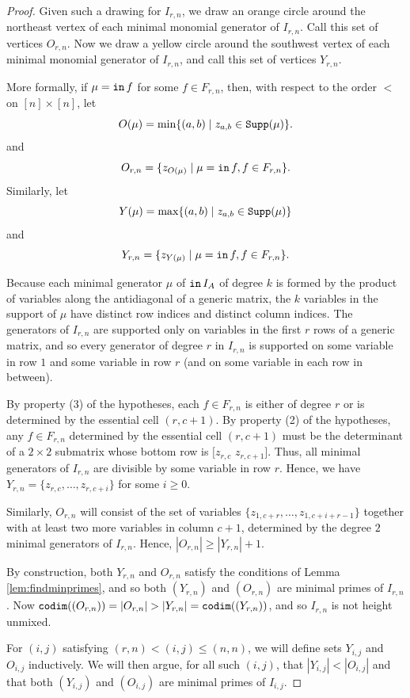 \documentclass[12 pt]{amsart}
\DeclareMathOperator{\init}{{\tt in}}
\DeclareMathOperator{\supp}{{\tt Supp}}
\DeclareMathOperator{\codim}{{\tt codim}}
\theoremstyle{plain}
\theoremstyle{definition}
\theoremstyle{remark}
\begin{document}
{\begin{proof}
Given such a drawing for $I_{r,n}$, we draw an orange circle around the northeast vertex of each minimal monomial generator of $I_{r,n}$. Call this set of vertices $O_{r,n}$. Now we draw a yellow circle around the southwest vertex of each minimal monomial generator of $I_{r,n}$, and call this set of vertices $Y_{r,n}$. 

More formally, if $\mu = \init f$ for some $f \in F_{r,n}$, then, with respect to the  order $<$ on $[n] \times [n]$, let 
\[
O(\mu) = \min\{(a,b) \mid z_{a,b} \in \supp(\mu)\}.
\] and \[
O_{r,n} = \{z_{O(\mu)} \mid \mu = \init f, f \in F_{r,n}\}.
\]  Similarly, let \[
Y(\mu) = \max\{(a,b) \mid z_{a,b} \in \supp(\mu)\}
\] and \[
Y_{r,n} = \{z_{Y(\mu)} \mid \mu = \init f, f \in F_{r,n}\}.
\]

Because each minimal generator $\mu$ of $\init I_A$ of degree $k$ is formed by the product of variables along the antidiagonal of a generic matrix, the $k$ variables in the support of $\mu$ have distinct row indices and distinct column indices. The generators of $I_{r,n}$ are supported only on variables in the first $r$ rows of a generic matrix, and so every generator of degree $r$ in $I_{r,n}$ is supported on some variable in row $1$ and some variable in row $r$ (and on some variable in each row in between).





By property (3) of the hypotheses, each $f \in F_{r,n}$ is either of degree $r$ or is determined by the essential cell $(r,c+1)$. By property (2) of the hypotheses, any $f \in F_{r,n}$ determined by the essential cell $(r,c+1)$ must be the determinant of a $2 \times 2$ submatrix whose bottom row is $[z_{r,c}$ $z_{r,c+1}]$. Thus, all minimal generators of $I_{r,n}$ are divisible by some variable in row $r$.  Hence, we have $Y_{r,n} = \{z_{r,c}, \ldots, z_{r, c+i}\}$ for some $i \geq 0$. 

Similarly, $O_{r,n}$ will consist of the set of variables $\{z_{1,c+r},\ldots, z_{1,c+i+r-1}\}$ together with at least two more variables in column $c+1$, determined by the degree $2$ minimal generators of $I_{r,n}$. Hence, $|O_{r,n}| \geq |Y_{r,n}|+1$.

By construction, both $Y_{r,n}$ and $O_{r,n}$ satisfy the conditions of Lemma \ref{lem:findminprimes}, and so both $(Y_{r,n})$ and $(O_{r,n})$ are minimal primes of $I_{r,n}$. Now $\codim((O_{r,n})) = |O_{r,n}| >|Y_{r,n}| = \codim((Y_{r,n}))$, and so $I_{r,n}$ is not height unmixed.

For $(i,j)$ satisfying $(r,n)<(i,j) \leq (n,n)$, we will define sets $Y_{i,j}$ and $O_{i,j}$ inductively. We will then argue, for all such $(i,j)$, that $|Y_{i,j}|<|O_{i,j}|$ and that both $(Y_{i,j})$ and $(O_{i,j})$ are minimal primes of $I_{i,j}$.


\end{proof}}
\end{document}
